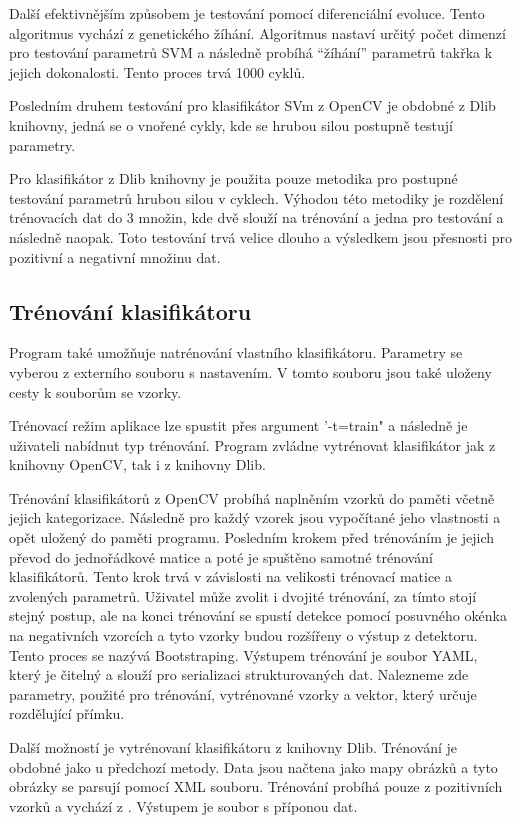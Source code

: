 Další efektivnějším způsobem je testování pomocí diferenciální evoluce. Tento algoritmus vychází z genetického žíhání. Algoritmus nastaví určitý počet dimenzí pro testování parametrů SVM a následně probíhá ``žíhání'' parametrů takřka k jejich dokonalosti. Tento proces trvá 1000 cyklů.

Posledním druhem testování pro klasifikátor SVm z OpenCV je obdobné z Dlib knihovny, jedná se o vnořené cykly, kde se hrubou silou postupně testují parametry. 

Pro klasifikátor z Dlib knihovny je použita pouze metodika pro postupné testování parametrů hrubou silou v cyklech. Výhodou této metodiky je rozdělení trénovacích dat do 3 množin, kde dvě slouží na trénování a jedna pro testování a následně naopak. Toto testování trvá velice dlouho a výsledkem jsou přesnosti pro pozitivní a negativní množinu dat.


\subsection{Trénování klasifikátoru}
Program také umožňuje natrénování vlastního klasifikátoru. Parametry se vyberou z externího souboru s nastavením. V tomto souboru jsou také uloženy cesty k souborům se vzorky. 

Trénovací režim aplikace lze spustit přes argument '-t=train" a následně je uživateli nabídnut typ trénování. Program zvládne vytrénovat klasifikátor jak z knihovny OpenCV, tak i z knihovny Dlib. 

Trénování klasifikátorů z OpenCV probíhá naplněním vzorků do paměti včetně jejich kategorizace. Následně pro každý vzorek jsou vypočítané jeho vlastnosti a opět uložený do paměti programu. Posledním krokem před trénováním je jejich převod do jednořádkové matice a poté je spuštěno samotné trénování klasifikátorů. Tento krok trvá v závislosti na velikosti trénovací matice a zvolených parametrů. Uživatel může zvolit i dvojité trénování, za tímto stojí stejný postup, ale na konci trénování se spustí detekce pomocí posuvného okénka na negativních vzorcích a tyto vzorky budou rozšířeny o výstup z detektoru. Tento proces se nazývá Bootstraping. Výstupem trénování je soubor YAML, který je čitelný a slouží pro serializaci strukturovaných dat. Nalezneme zde parametry, použité pro trénování, vytrénované vzorky a vektor, který určuje rozdělující přímku.

Další možností je vytrénovaní klasifikátoru z knihovny Dlib. Trénování je obdobné jako u předchozí metody. Data jsou načtena jako mapy obrázků a tyto obrázky se parsují pomocí XML souboru. Trénování probíhá pouze z pozitivních vzorků a vychází z \cite{hog:dalal}. Výstupem je soubor s příponou dat.

